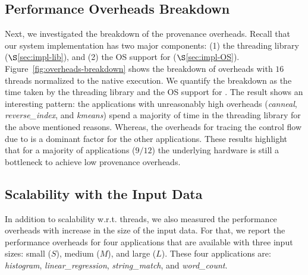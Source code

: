 
%



\subsection{Performance Overheads Breakdown} 
\label{subsec:performance-overheads-breakdown}

Next, we investigated the breakdown of the provenance overheads. Recall that our system implementation has two major components: (1) the threading library ($\S$\ref{sec:impl-lib}), and (2) the OS support for \intelpt ($\S$\ref{sec:impl-OS}). 
Figure~\ref{fig:overheads-breakdown} shows the breakdown of overheads with $16$ threads normalized to the native \pthreads execution. We quantify the breakdown as the time taken by the threading library  and the OS support for \intelpt  . The result shows an interesting pattern: the applications with unreasonably high overheads ({\em canneal}, {\em reverse\_index}, and {\em kmeans}) spend a majority of time in the threading library for the above mentioned reasons. Whereas, the overheads for tracing the control flow due to \intelpt  is a dominant factor for the other applications. These results highlight that for a majority of applications ($9/12$) the underlying hardware is still a bottleneck to achieve low provenance overheads.  


\subsection{Scalability with the Input Data}
\label{subsec:data-sizes-overheads}


 In addition to scalability w.r.t.  threads, we also measured the performance overheads with increase in the size of the input data.  For that, we
report the performance overheads for four applications that are available with
three input sizes: small ($S$), medium ($M$), and large ($L$). These four applications are: {\em histogram}, {\em linear\_regression}, {\em string\_match}, and {\em word\_count}.

